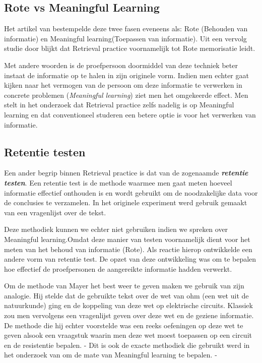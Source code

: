 \documentclass{hogent-article}
\newcommand{\boldit}[1]{\emph{\textbf{#1}}}
\begin{document}
\subsection{Rote vs Meaningful Learning}
\label{RoteVSMeaningful}
Het artikel van \textcite{Mayer_2002} bestempelde deze twee fasen eveneens als: Rote (Behouden van informatie) en Meaningful learning(Toepassen van informatie). Uit een vervolg studie door \textcite{van_Gog_2012} blijkt dat Retrieval practice voornamelijk tot Rote memorisatie leidt.\\

\par
\noindent
Met andere woorden is de proefpersoon doormiddel van deze techniek beter instaat de informatie op te halen in zijn originele vorm. Indien men echter gaat kijken naar het vermogen van de persoon om deze informatie te verwerken in concrete problemen (\textit{Meaningful learning}) ziet men het omgekeerde effect. Men stelt in het onderzoek dat Retrieval practice zelfs nadelig is op Meaningful learning en dat conventioneel studeren een betere optie is voor het verwerken van informatie.\\
\par
\noindent

\subsection{Retentie testen}
Een ander begrip binnen Retrieval practice is dat van de zogenaamde \boldit{retentie testen}. Een retentie test is de methode waarmee men gaat meten hoeveel informatie effectief onthouden is en wordt gebruikt om de noodzakelijke data voor de conclusies te verzamelen. In het originele experiment \textcite{Roediger_2006} werd gebruik gemaakt van een vragenlijst over de tekst.\\

\par
\noindent
Deze methodiek kunnen we echter niet gebruiken indien we spreken over Meaningful learning.Omdat deze manier van testen voornamelijk dient voor het meten van het behoud van informatie (Rote). Als reactie hierop ontwikkelde \textcite{Mayer_2002} een andere vorm van retentie test. De opzet van deze ontwikkeling was om te bepalen hoe effectief de proefpersonen de aangereikte informatie hadden verwerkt.\\
\par
\noindent
Om de methode van Mayer het best weer te geven maken we gebruik van zijn analogie. Hij stelde dat de gebruikte tekst over de wet van ohm (een wet uit de natuurkunde) ging en de koppeling van deze wet op elektrische circuits. Klassiek zou men vervolgens een vragenlijst geven over deze wet en de geziene informatie. De methode die hij echter voorstelde was een reeks oefeningen op deze wet te geven alsook een vraagstuk waarin men deze wet moest toepassen op een circuit en de resistentie bepalen. - Dit is ook de exacte methodiek die gebruikt werd in het onderzoek van \textcite{van_Gog_2012} om de mate van Meaningful learning te bepalen. -
\end{document}
